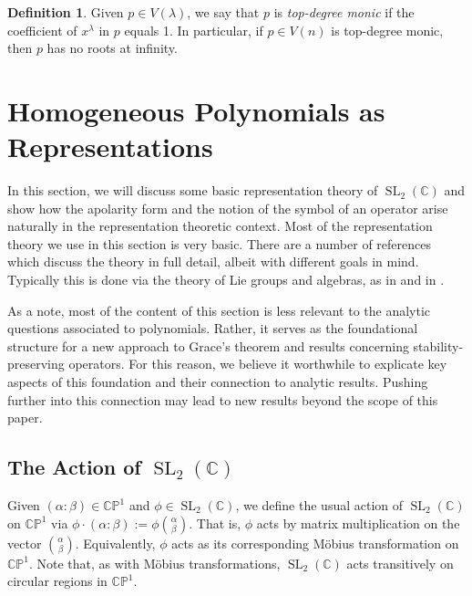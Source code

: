 \documentclass{article}
\theoremstyle{definition}
\newtheorem{definition}[theorem]{Definition}
\theoremstyle{plain}
\newcommand{\C}{\mathbb{C}}
\newcommand{\CP}{\mathbb{CP}}
\DeclareMathOperator{\SL}{SL}
\begin{document}
\begin{definition}
    Given $p \in V(\lambda)$, we say that $p$ is \emph{top-degree monic} if the coefficient of $x^\lambda$ in $p$ equals 1. In particular, if $p \in V(n)$ is top-degree monic, then $p$ has no roots at infinity.
\end{definition}


\section{Homogeneous Polynomials as Representations}\label{reps_sect}

In this section, we will discuss some basic representation theory of $\SL_2(\C)$ and show how the apolarity form and the notion of the symbol of an operator arise naturally in the representation theoretic context. Most of the representation theory we use in this section is very basic. There are a number of references which discuss the theory in full detail, albeit with different goals in mind. Typically this is done via the theory of Lie groups and algebras, as in \cite{fulton2013reptheory} and in \cite{humphreys2012lietheory}.

As a note, most of the content of this section is less relevant to the analytic questions associated to polynomials. Rather, it serves as the foundational structure for a new approach to Grace's theorem and results concerning stability-preserving operators. For this reason, we believe it worthwhile to explicate key aspects of this foundation and their connection to analytic results. Pushing further into this connection may lead to new results beyond the scope of this paper.

\subsection{The Action of \texorpdfstring{$\SL_2(\C)$}{SL2(C)}}\label{SL_action_subsect}

Given $(\alpha:\beta) \in \CP^1$ and $\phi \in \SL_2(\C)$, we define the usual action of $\SL_2(\C)$ on $\CP^1$ via $\phi \cdot (\alpha:\beta) := \phi \binom{\alpha}{\beta}$. That is, $\phi$ acts by matrix multiplication on the vector $\binom{\alpha}{\beta}$. Equivalently, $\phi$ acts as its corresponding M{\"o}bius transformation on $\CP^1$. Note that, as with M{\"o}bius transformations, $\SL_2(\C)$ acts transitively on circular regions in $\CP^1$.
\end{document}
